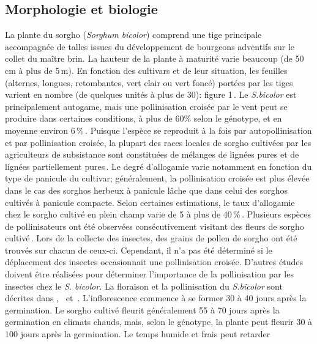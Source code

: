 \documentclass[a4paper,11pt]{article}
\begin{document}
\subsection{Morphologie et biologie} La plante du sorgho
(\emph{Sorghum bicolor}) comprend une tige principale accompagnée de
talles issues du développement de bourgeons adventifs sur le collet du
maître brin. La hauteur de la plante à maturité varie beaucoup (de
50\,cm à plus de 5\,m). En fonction des cultivars et de leur
situation, les feuilles (alternes, longues, retombantes, vert clair ou
vert foncé) portées par les tiges varient en nombre (de quelques
unités à plus de 30): figure 1\,\cite{BARRO_KONDOMBO_2010}. Le
\emph{S.bicolor} est principalement autogame, mais une pollinisation
croisée par le vent peut se produire dans certaines conditions, à plus
de 60\% selon le génotype, et en moyenne environ
6\,\%\,\cite{Ellstrand_1983,
  House85,Pedersen_1998,Schertz_1980}. Puisque l'espèce se reproduit à
la fois par autopollinisation et par pollinisation croisée, la plupart
des races locales de sorgho cultivées par les agriculteurs de
subsistance sont constituées de mélanges de lignées pures et de
lignées partiellement pures\,\cite{SINGH_1997}. Le degré d'allogamie
varie notamment en fonction du type de panicule du cultivar;
généralement, la pollinisation croisée est plus élevée dans le cas des
sorghos herbeux à panicule lâche que dans celui des sorghos cultivés à
panicule compacte. Selon certaines estimations, le taux d'allogamie
chez le sorgho cultivé en plein champ varie de 5 à plus de
40\,\%\,\cite{Barnaud_2008, DJE_2004, Doggett_1988,
  Ellstrand_1983,Schmidt_2006}. Plusieurs espèces de pollinisateurs
ont été observées consécutivement visitant des fleurs de sorgho
cultivé\,\cite{Immelman_2000, Schmidt_2006}. Lors de la collecte des
insectes, des grains de pollen de sorgho ont été trouvés sur chacun de
ceux-ci. Cependant, il n'a pas été déterminé si le déplacement des
insectes occasionnait une pollinisation croisée. D'autres études
doivent être réalisées pour déterminer l'importance de la
pollinisation par les insectes chez le \emph{S. bicolor}. La floraison
et la pollinisation du \emph{S.bicolor} sont décrites
dans\,\citeauthor{House85}\,\citeyear{House85},
\citeauthor{SINGH_1997} \,\citeyear{SINGH_1997} et
\citeauthor{SRINIVASA_2013}\,\citeyear{SRINIVASA_2013}. L'inflorescence
commence à se former 30 à 40 jours après la germination. Le sorgho
cultivé fleurit généralement 55 à 70 jours après la germination en
climats chauds, mais, selon le génotype, la plante peut fleurir 30 à
100 jours après la germination. Le temps humide et frais peut retarder
\end{document}
